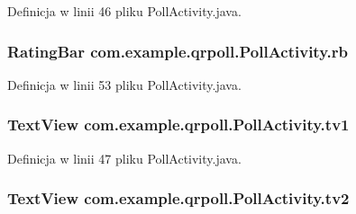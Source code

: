 Definicja w linii 46 pliku Poll\+Activity.\+java.

\hypertarget{classcom_1_1example_1_1qrpoll_1_1_poll_activity_a3c2b3e0864209b0253263a7af2642a13}{
\subsubsection[{rb}]{\setlength{\rightskip}{0pt plus 5cm}Rating\+Bar com.\+example.\+qrpoll.\+Poll\+Activity.\+rb\hspace{0.3cm}{\ttfamily [private]}}}\label{classcom_1_1example_1_1qrpoll_1_1_poll_activity_a3c2b3e0864209b0253263a7af2642a13}


Definicja w linii 53 pliku Poll\+Activity.\+java.

\hypertarget{classcom_1_1example_1_1qrpoll_1_1_poll_activity_a7928323c2d0f40aa25420488718de309}{
\subsubsection[{tv1}]{\setlength{\rightskip}{0pt plus 5cm}Text\+View com.\+example.\+qrpoll.\+Poll\+Activity.\+tv1\hspace{0.3cm}{\ttfamily [private]}}}\label{classcom_1_1example_1_1qrpoll_1_1_poll_activity_a7928323c2d0f40aa25420488718de309}


Definicja w linii 47 pliku Poll\+Activity.\+java.

\hypertarget{classcom_1_1example_1_1qrpoll_1_1_poll_activity_a48f7da0dc1da430cd5ac90a8376cad70}{
\subsubsection[{tv2}]{\setlength{\rightskip}{0pt plus 5cm}Text\+View com.\+example.\+qrpoll.\+Poll\+Activity.\+tv2\hspace{0.3cm}{\ttfamily [private]}}}\label{classcom_1_1example_1_1qrpoll_1_1_poll_activity_a48f7da0dc1da430cd5ac90a8376cad70}



